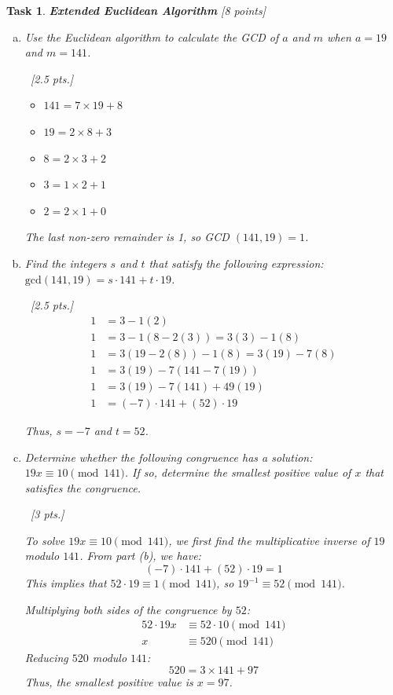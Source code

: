 \documentclass[11pt,twoside,a4paper]{article}
\theoremstyle{exercise}
\newtheorem{exercise}{Task}
\begin{document}
\begin{exercise}\textbf{Extended Euclidean Algorithm }[8 points]

\begin{enumerate}[(a)]
\item Use the Euclidean algorithm to calculate the GCD of $a$ and $m$ when $a = 19$ and $m = 141$.

\ \hfill [2.5 pts.]

\begin{itemize}
    \item $141 = 7 \times 19 + 8$
    \item $19 = 2 \times 8 + 3$
    \item $8 = 2 \times 3 + 2$
    \item $3 = 1 \times 2 + 1$
    \item $2 = 2 \times 1 + 0$
\end{itemize}
The last non-zero remainder is 1, so  GCD $(141, 19) = 1$.

\vspace{0.5cm}
\item Find the integers $s$ and $t$ that satisfy the following expression: $\text{gcd}(141,19)=s\cdot 141 + t\cdot 19$. 

\ \hfill [2.5 pts.]
\begin{align*}
1 &= 3 - 1(2) \\
1 &= 3 - 1(8 - 2(3)) = 3(3) - 1(8) \\
1 &= 3(19 - 2(8)) - 1(8) = 3(19) - 7(8) \\
1 &= 3(19) - 7(141 - 7(19)) \\
1 &= 3(19) - 7(141) + 49(19) \\
1 &= (-7) \cdot 141 + (52) \cdot 19
\end{align*}

Thus, $s = -7$ and $t = 52$.

\vspace{0.3cm}
\item Determine whether the following congruence has a solution: $19x \equiv 10 \pmod{141}$. If so, determine the smallest positive value of $x$ that satisfies the congruence. 

\ \hfill [3 pts.]

To solve $19x \equiv 10 \pmod{141}$, we first find the multiplicative inverse of $19$ modulo $141$. From part (b), we have:
\[ (-7) \cdot 141 + (52) \cdot 19 = 1 \]
This implies that $52 \cdot 19 \equiv 1 \pmod{141}$, so $19^{-1} \equiv 52 \pmod{141}$.

Multiplying both sides of the congruence by $52$:
\begin{align*}
52 \cdot 19x &\equiv 52 \cdot 10 \pmod{141} \\
x &\equiv 520 \pmod{141}
\end{align*}
Reducing $520$ modulo $141$:
\[ 520 = 3 \times 141 + 97 \]
Thus, the smallest positive value is $x = 97$.

\end{enumerate}
\end{exercise}
\end{document}
